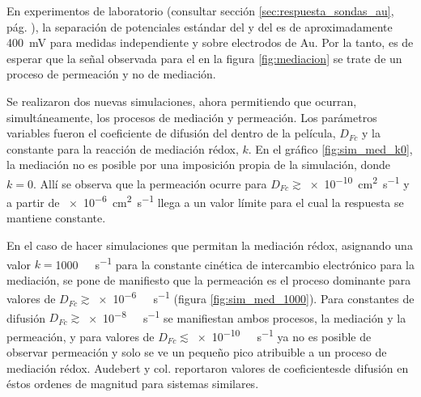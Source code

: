 		En experimentos de laboratorio (consultar sección \ref{sec:respuesta_sondas_au}, pág. \pageref{sec:respuesta_sondas_au}), la separación de potenciales estándar del \ru\space y del \fc\space es de aproximadamente \SI{400}{\milli\volt} para medidas independiente y sobre electrodos de Au. Por la tanto, es de esperar que la señal observada para el \fc\space en la figura \ref{fig:mediacion} se trate de un proceso de permeación y no de mediación.

		Se realizaron dos nuevas simulaciones, ahora permitiendo que ocurran, simultáneamente, los procesos de mediación y permeación. Los parámetros variables fueron el coeficiente de difusión del \fc\space dentro de la película, $D_{Fc}$ y la constante para la reacción de mediación rédox, $k$. En el gráfico \ref{fig:sim_med_k0}, la mediación no es posible por una imposición propia de la simulación, donde $k\!=\!0$. Allí se observa que la permeación ocurre para $D_{Fc}\!\!\gtrsim$\SI{e-10}{\square\cm\per\second} y a partir de \SI{e-6}{\square\cm\per\second} llega a un valor límite para el cual la respuesta se mantiene constante.

		En el caso de hacer simulaciones que permitan la mediación rédox, asignando una valor $k\!=$\SI{1000}{\per\Molar\per\second} para la constante cinética de intercambio electrónico para la mediación, se pone de manifiesto que la permeación es el proceso dominante para valores de $D_{Fc}\!\gtrsim$\SI{e-6}{\per\Molar\per\second} (figura \ref{fig:sim_med_1000}). Para constantes de difusión $D_{Fc}\!\gtrsim$\SI{e-8}{\per\Molar\per\second} se manifiestan ambos procesos, la mediación y la permeación, y para valores de $D_{Fc}\!\lesssim$\SI{e-10}{\per\Molar\per\second} ya no es posible de observar permeación y solo se ve un pequeño pico atribuible a un proceso de mediación rédox. Audebert y col. reportaron valores de coeficientesde difusión en éstos ordenes de magnitud para sistemas similares\cite{Audebert2015}. 

